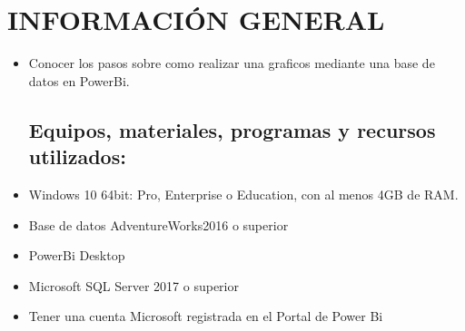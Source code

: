 \section{INFORMACIÓN GENERAL} 

\begin{itemize}
\subsection{Objetivos:}
	\item Conocer los pasos sobre como realizar una graficos mediante una base de datos en PowerBi.
\subsection{Equipos, materiales, programas y recursos utilizados:}
	\item Windows 10 64bit: Pro, Enterprise o Education, con al menos 4GB de RAM.
	\item Base de datos AdventureWorks2016 o superior
	\item PowerBi Desktop
	\item Microsoft SQL Server 2017 o superior
	\item Tener una cuenta Microsoft registrada en el Portal de Power Bi

\end{itemize}
